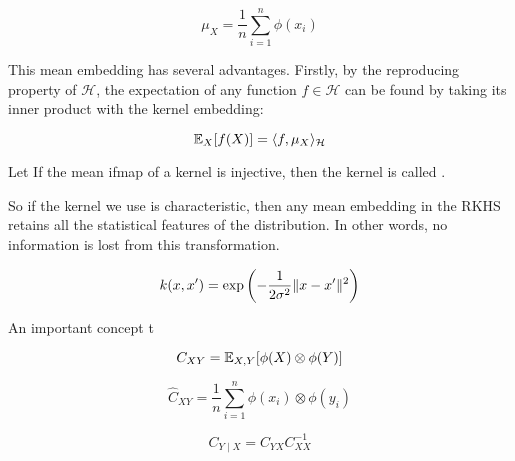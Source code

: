 \begin{equation}
\mu_{X} = \frac{1}{n} \sum_{i=1}^n \phi(x_i)
\end{equation}

This mean embedding has several advantages. Firstly, by the reproducing property of $\mathcal{H}$, the expectation of any function $f \in \mathcal{H}$ can be found by taking its inner product with the kernel embedding:

\begin{equation}
\mathbb{E}_X[f(X)] = \langle f, \mu_X\rangle_\mathcal{H}
\end{equation}

\begin{definition}
  Let If the mean ifmap of a kernel is injective, then the kernel is called .
\end{definition}

So if the kernel we use is characteristic, then any mean embedding in the RKHS retains all the statistical features of the distribution. In other words, no information is lost from this transformation.

\begin{equation}
  k(x,x') = \exp\left(-\frac{1}{2\sigma^2} \lVert x-x'\rVert^2 \right)
\end{equation}

An important concept t

\begin{equation}
  C_{XY} = \mathbb{E}_{X, Y}[\phi(X) \otimes \phi(Y)]
\end{equation}

\begin{equation}
  \widehat{C}_{XY} = \frac{1}{n} \sum_{i=1}^n \phi(x_i) \otimes \phi(y_i)
\end{equation}

\begin{equation}
  C_{Y \mid X} = C_{YX} C_{XX}^{-1}
\end{equation}
